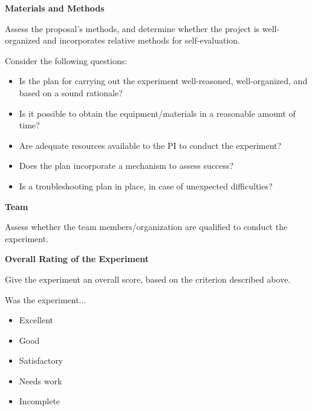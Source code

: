 \textbf{Materials and Methods}

Assess the proposal's methods, and determine whether the project is well-organized and incorporates relative methods for self-evaluation.

Consider the following questions:
\begin{itemize}
\item Is the plan for carrying out the experiment well-reasoned, well-organized, and based on a sound rationale?
\item Is it possible to obtain the equipment/materials in a reasonable amount of time?
\item Are adequate resources available to the PI to conduct the experiment?
\item Does the plan incorporate a mechanism to assess success?
\item Is a troubleshooting plan in place, in case of unexpected difficulties?
\end{itemize}

\textbf{Team}

Assess whether the team members/organization are qualified to conduct the experiment.

\textbf{Overall Rating of the Experiment}

Give the experiment an overall score, based on the criterion described above.

Was the experiment...
\begin{itemize}
\item Excellent
\item Good
\item Satisfactory
\item Needs work
\item Incomplete
\end{itemize}



